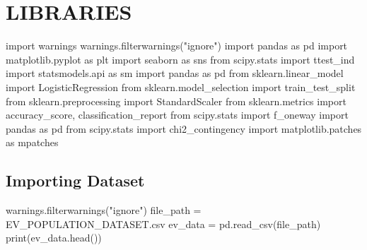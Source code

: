 \documentclass[
  letterpaper,
  DIV=11,
  numbers=noendperiod]{scrartcl}
\newenvironment{Shaded}{\begin{snugshade}}{\end{snugshade}}
\newcommand{\BuiltInTok}[1]{\textcolor[rgb]{0.00,0.23,0.31}{#1}}
\newcommand{\ImportTok}[1]{\textcolor[rgb]{0.00,0.46,0.62}{#1}}
\newcommand{\NormalTok}[1]{\textcolor[rgb]{0.00,0.23,0.31}{#1}}
\newcommand{\OperatorTok}[1]{\textcolor[rgb]{0.37,0.37,0.37}{#1}}
\newcommand{\StringTok}[1]{\textcolor[rgb]{0.13,0.47,0.30}{#1}}
\begin{document}
\hypertarget{libraries}{%
\section{LIBRARIES}\label{libraries}}

\begin{Shaded}
\begin{Highlighting}[]
\ImportTok{import}\NormalTok{ warnings}
\NormalTok{warnings.filterwarnings(}\StringTok{"ignore"}\NormalTok{)}
\ImportTok{import}\NormalTok{ pandas }\ImportTok{as}\NormalTok{ pd}
\ImportTok{import}\NormalTok{ matplotlib.pyplot }\ImportTok{as}\NormalTok{ plt}
\ImportTok{import}\NormalTok{ seaborn }\ImportTok{as}\NormalTok{ sns}
\ImportTok{from}\NormalTok{  scipy.stats }\ImportTok{import}\NormalTok{ ttest\_ind}
\ImportTok{import}\NormalTok{ statsmodels.api }\ImportTok{as}\NormalTok{ sm}
\ImportTok{import}\NormalTok{ pandas }\ImportTok{as}\NormalTok{ pd}
\ImportTok{from}\NormalTok{ sklearn.linear\_model }\ImportTok{import}\NormalTok{ LogisticRegression}
\ImportTok{from}\NormalTok{ sklearn.model\_selection }\ImportTok{import}\NormalTok{ train\_test\_split}
\ImportTok{from}\NormalTok{ sklearn.preprocessing }\ImportTok{import}\NormalTok{ StandardScaler}
\ImportTok{from}\NormalTok{ sklearn.metrics }\ImportTok{import}\NormalTok{ accuracy\_score, classification\_report}
\ImportTok{from}\NormalTok{ scipy.stats }\ImportTok{import}\NormalTok{ f\_oneway}
\ImportTok{import}\NormalTok{ pandas }\ImportTok{as}\NormalTok{ pd}
\ImportTok{from}\NormalTok{ scipy.stats }\ImportTok{import}\NormalTok{ chi2\_contingency}
\ImportTok{import}\NormalTok{ matplotlib.patches }\ImportTok{as}\NormalTok{ mpatches}
\end{Highlighting}
\end{Shaded}

\hypertarget{importing-dataset}{%
\subsection{Importing Dataset}\label{importing-dataset}}

\begin{Shaded}
\begin{Highlighting}[]
\NormalTok{warnings.filterwarnings(}\StringTok{"ignore"}\NormalTok{)}
\NormalTok{file\_path }\OperatorTok{=} \StringTok{\textquotesingle{}EV\_POPULATION\_DATASET.csv\textquotesingle{}}
\NormalTok{ev\_data }\OperatorTok{=}\NormalTok{ pd.read\_csv(file\_path)}
\BuiltInTok{print}\NormalTok{(ev\_data.head())}
\end{Highlighting}
\end{Shaded}
\end{document}
